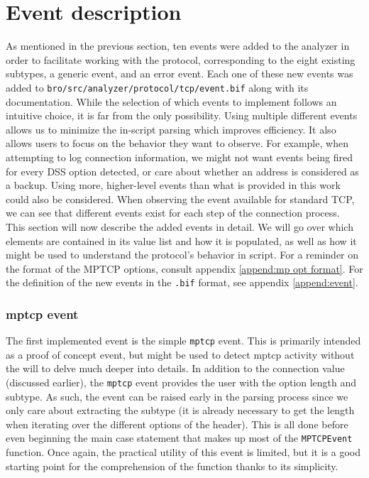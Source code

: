 \section{Event description}
As mentioned in the previous section, ten events were added to the analyzer in order to facilitate working with the protocol, corresponding to the eight existing subtypes, a generic event, and an error event. Each one of these new events was added to \texttt{bro/src/analyzer/protocol/tcp/event.bif} along with its documentation. While the selection of which events to implement follows an intuitive choice, it is far from the only possibility. Using multiple different events allows us to minimize the in-script parsing which improves efficiency. It also allows users to focus on the behavior they want to observe. For example, when attempting to log connection information, we might not want events being fired for every DSS option detected, or care about whether an address is considered as a backup. Using more, higher-level events than what is provided in this work could also be considered. When observing the event available for standard TCP, we can see that different events exist for each step of the connection process. \\

This section will now describe the added events in detail. We will go over which elements are contained in its value list and how it is populated, as well as how it might be used to understand the protocol's behavior in script. For a reminder on the format of the MPTCP options, consult appendix \ref{append:mp opt format}. For the definition of the new events in the \texttt{.bif} format, see appendix \ref{append:event}.

\subsubsection{mptcp event}
The first implemented event is the simple \texttt{mptcp} event. This is primarily intended as a proof of concept event, but might be used to detect mptcp activity without the will to delve much deeper into details. In addition to the connection value (discussed earlier), the \texttt{mptcp} event provides the user with the option length and subtype. As such, the event can be raised early in the parsing process since we only care about extracting the subtype (it is already necessary to get the length when iterating over the different options of the header). This is all done before even beginning the main case statement that makes up most of the \texttt{MPTCPEvent} function. Once again, the practical utility of this event is limited, but it is a good starting point for the comprehension of the function thanks to its simplicity. \\

